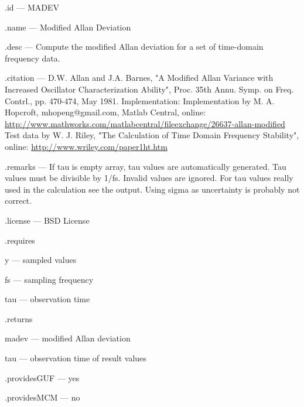 \begin{tightdesc}
\item [\textsf{.id}] --- MADEV
\item [\textsf{.name}] --- Modified Allan Deviation
\item [\textsf{.desc}] --- Compute the modified Allan deviation for a set of time-domain frequency data.
\item [\textsf{.citation}] --- D.W. Allan and J.A. Barnes, "A Modified Allan Variance with Increased Oscillator Characterization Ability", Proc. 35th Annu. Symp. on Freq. Contrl., pp. 470-474, May 1981. Implementation: Implementation by M. A. Hopcroft, mhopeng@gmail.com, Matlab Central, online: \url{http://www.mathworks.com/matlabcentral/fileexchange/26637-allan-modified} Test data by W. J. Riley, "The Calculation of Time Domain Frequency Stability", online: \url{http://www.wriley.com/paper1ht.htm}
\item [\textsf{.remarks}] --- If tau is empty array, tau values are automatically generated. Tau values must be divisible by 1/fs. Invalid values are ignored. For tau values really used in the calculation see the output. Using sigma as uncertainty is probably not correct.
\item [\textsf{.license}] --- BSD License
\item [\textsf{.requires}] \rule{0em}{0em}
\begin{tightdesc}
\item [\textsf{y}] --- sampled values
\item [\textsf{fs}] --- sampling frequency
\item [\textsf{tau}] --- observation time
\end{tightdesc}
\item [\textsf{.returns}] \rule{0em}{0em}
\begin{tightdesc}
\item [\textsf{madev}] --- modified Allan deviation
\item [\textsf{tau}] --- observation time of result values
\end{tightdesc}
\item [\textsf{.providesGUF}] --- yes
\item [\textsf{.providesMCM}] ---  no
\end{tightdesc}
